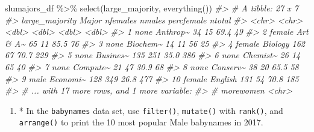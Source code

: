 \documentclass[
]{book}
\newenvironment{Shaded}{\begin{snugshade}}{\end{snugshade}}
\newcommand{\CommentTok}[1]{\textcolor[rgb]{0.56,0.35,0.01}{\textit{#1}}}
\newcommand{\FunctionTok}[1]{\textcolor[rgb]{0.00,0.00,0.00}{#1}}
\newcommand{\NormalTok}[1]{#1}
\newcommand{\SpecialCharTok}[1]{\textcolor[rgb]{0.00,0.00,0.00}{#1}}
\providecommand{\tightlist}{%
  \setlength{\itemsep}{0pt}\setlength{\parskip}{0pt}}
\begin{document}
\begin{Shaded}
\begin{Highlighting}[]
\NormalTok{slumajors\_df }\SpecialCharTok{\%\textgreater{}\%} \FunctionTok{select}\NormalTok{(large\_majority, }\FunctionTok{everything}\NormalTok{())}
\CommentTok{\#\textgreater{} \# A tibble: 27 x 7}
\CommentTok{\#\textgreater{}    large\_majority Major    nfemales nmales percfemale ntotal}
\CommentTok{\#\textgreater{}    \textless{}chr\textgreater{}          \textless{}chr\textgreater{}       \textless{}dbl\textgreater{}  \textless{}dbl\textgreater{}      \textless{}dbl\textgreater{}  \textless{}dbl\textgreater{}}
\CommentTok{\#\textgreater{}  1 none           Anthrop\textasciitilde{}       34     15       69.4     49}
\CommentTok{\#\textgreater{}  2 female         Art \& A\textasciitilde{}       65     11       85.5     76}
\CommentTok{\#\textgreater{}  3 none           Biochem\textasciitilde{}       14     11       56       25}
\CommentTok{\#\textgreater{}  4 female         Biology       162     67       70.7    229}
\CommentTok{\#\textgreater{}  5 none           Busines\textasciitilde{}      135    251       35.0    386}
\CommentTok{\#\textgreater{}  6 none           Chemist\textasciitilde{}       26     14       65       40}
\CommentTok{\#\textgreater{}  7 none           Compute\textasciitilde{}       21     47       30.9     68}
\CommentTok{\#\textgreater{}  8 none           Conserv\textasciitilde{}       38     20       65.5     58}
\CommentTok{\#\textgreater{}  9 male           Economi\textasciitilde{}      128    349       26.8    477}
\CommentTok{\#\textgreater{} 10 female         English       131     54       70.8    185}
\CommentTok{\#\textgreater{} \# ... with 17 more rows, and 1 more variable:}
\CommentTok{\#\textgreater{} \#   morewomen \textless{}chr\textgreater{}}
\end{Highlighting}
\end{Shaded}

\begin{enumerate}
\def\labelenumi{\arabic{enumi}.}
\setcounter{enumi}{2}
\tightlist
\item
  * In the \texttt{babynames} data set, use \texttt{filter()}, \texttt{mutate()} with \texttt{rank()}, and \texttt{arrange()} to print the 10 most popular Male babynames in 2017.
\end{enumerate}
\end{document}
